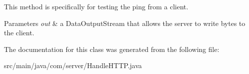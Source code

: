 This method is specifically for testing the ping from a client. 


\begin{DoxyParams}{Parameters}
{\em out} & a Data\-Output\-Stream that allows the server to write bytes to the client. \\
\hline
\end{DoxyParams}


The documentation for this class was generated from the following file\-:\begin{DoxyCompactItemize}
\item 
src/main/java/com/server/Handle\-H\-T\-T\-P.\-java\end{DoxyCompactItemize}

